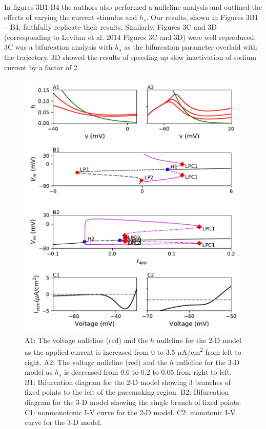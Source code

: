 In figures 3B1-B4 the authors also performed a nullcline analysis and outlined the effects of varying the current stimulus and $h_s$. Our results, shown in Figures 3B1 – B4, faithfully replicate their results. Similarly, Figures 3C and 3D (corresponding to Levitan et al. 2014 Figures 3C and 3D) were well reproduced. 3C was a bifurcation analysis with $h_s$ as the bifurcation parameter overlaid with the trajectory. 3D showed the results of speeding up slow inactivation of sodium current by a factor of 2.\\ 


\begin{figure}
	\centering
	\includegraphics[scale=0.7]{../figures/figure_4.pdf}
	\caption{A1: The voltage nullcline (red) and the $h$ nullcline for the 2-D model as the applied current is increased from 0 to 3.5 $\mu$A/cm\textsuperscript{2} from left to right. A2: The voltage nullcline (red) and the $h$ nullcline for the 3-D model as $h_s$ is decreased from 0.6 to 0.2 to 0.05 from right to left. B1: Bifurcation diagram for the 2-D model showing 3 branches of fixed points to the left of the pacemaking region. B2: Bifurcation diagram for the 3-D model showing the single branch of fixed points. C1: nonmonotonic I-V curve for the 2-D model. C2: monotonic I-V curve for the 3-D model. }
	\label{fig:4}
\end{figure}

